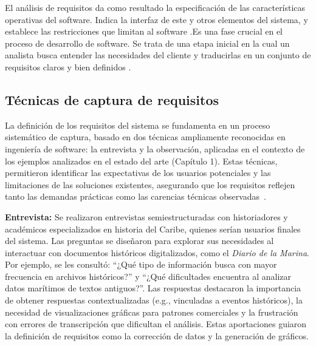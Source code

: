 El análisis de requisitos da como resultado la especificación de las características operativas del software. Indica la interfaz de este y otros elementos del sistema, y establece las restricciones que limitan al software \cite{pressman2010practitioner}.Es una fase crucial en el proceso de desarrollo de software. Se trata de una etapa inicial en la cual un analista busca entender las necesidades del cliente y traducirlas en un conjunto de requisitos claros y bien definidos \cite{palli2023analisis}.

\subsection{Técnicas de captura de requisitos}

La definición de los requisitos del sistema se fundamenta en un proceso sistemático de captura, basado en dos técnicas ampliamente reconocidas en ingeniería de software: la entrevista y la observación, aplicadas en el contexto de los ejemplos analizados en el estado del arte (Capítulo 1). Estas técnicas, permitieron identificar las expectativas de los usuarios potenciales y las limitaciones de las soluciones existentes, asegurando que los requisitos reflejen tanto las demandas prácticas como las carencias técnicas observadas~\cite{sommerville2011software}.

\textbf{Entrevista:} Se realizaron entrevistas semiestructuradas con historiadores y académicos especializados en historia del Caribe, quienes serían usuarios finales del sistema. Las preguntas se diseñaron para explorar sus necesidades al interactuar con documentos históricos digitalizados, como el \textit{Diario de la Marina}. Por ejemplo, se les consultó: ``¿Qué tipo de información busca con mayor frecuencia en archivos históricos?'' y ``¿Qué dificultades encuentra al analizar datos marítimos de textos antiguos?''. Las respuestas destacaron la importancia de obtener respuestas contextualizadas (e.g., vinculadas a eventos históricos), la necesidad de visualizaciones gráficas para patrones comerciales y la frustración con errores de transcripción que dificultan el análisis. Estas aportaciones guiaron la definición de requisitos como la corrección de datos y la generación de gráficos.

